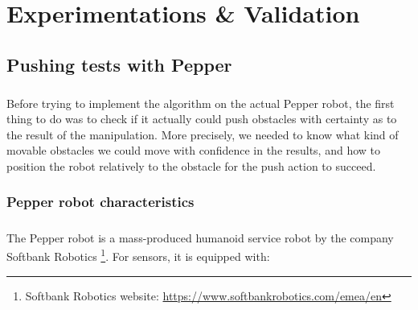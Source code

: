 
\chapter{Experimentations \& Validation} %

\label{Chapter5} %

\section{Pushing tests with Pepper}

\paragraph{} Before trying to implement the algorithm on the actual Pepper robot, the first thing to do was to check if it actually could push obstacles with certainty as to the result of the manipulation. More precisely, we needed to know what kind of movable obstacles we could move with confidence in the results, and how to position the robot relatively to the obstacle for the push action to succeed.

\subsection{Pepper robot characteristics}

\paragraph{} The Pepper robot is a mass-produced humanoid service robot by the company Softbank Robotics \footnote{Softbank Robotics website: \url{https://www.softbankrobotics.com/emea/en}}. For sensors, it is equipped with:

